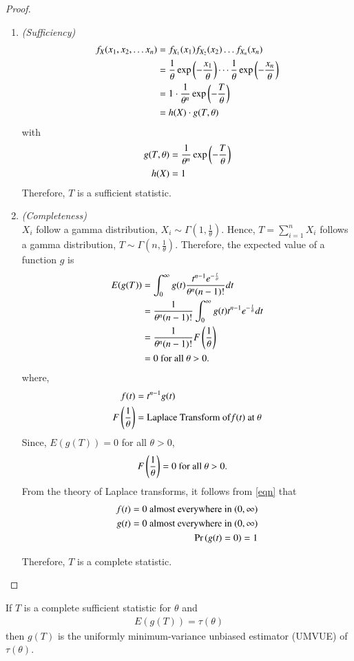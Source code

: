 \documentclass[journal,12pt,twocolumn]{IEEEtran}
\begin{document}
\begin{proof}
\begin{enumerate}
\item \textit{(Sufficiency)}
\begin{align}
f_{X}(x_1, x_2, \ldots x_n) &= f_{X_1}(x_1)f_{X_2}(x_2) \ldots f_{X_n}(x_n)\\
&= \dfrac{1}{\theta} \exp\left(-\dfrac{x_1}{\theta}\right) \cdots \dfrac{1}{\theta} \exp\left(-\dfrac{x_n}{\theta}\right)\\
&= 1 \cdot \dfrac{1}{\theta^n} \exp\left(-\dfrac{T}{\theta}\right)\\
&= h(X) \cdot g(T, \theta) 
\end{align}
with 
\begin{align}
g(T, \theta) &= \dfrac{1}{\theta^n} \exp\left(-\dfrac{T}{\theta}\right)\\
h(X) &= 1
\end{align}
Therefore, $T$ is a sufficient statistic.\\
\item \textit{(Completeness)}\\
$X_i$ follow a gamma distribution, $X_i \sim \Gamma (1, \frac{1}{\theta})$. Hence, $T = \sum_{i=1}^n X_i $ follows a gamma distribution, $T \sim \Gamma (n, \frac{1}{\theta})$. Therefore, the expected value of a function $g$ is
\begin{align}
E(g(T)) &= 
\int_0 ^{\infty} g(t) \dfrac{t^{n-1} e^{-\frac{t}{\theta}}}{\theta^n(n-1)!} dt\\ 
&= \frac{1}{\theta^n (n-1)!} \int_0 ^{\infty} g(t) t^{n-1} e^{-\frac{t}{\theta}} dt\\ 
&= \frac{1}{\theta^n (n-1)!} F \left(\frac{1}{\theta}\right)\\
&= 0 \text{ for all } \theta > 0.
\end{align}
where, 
\begin{align}
f(t) &= t^{n-1}g(t)\\
F \left(\frac{1}{\theta}\right) &= \text{Laplace Transform of} f(t) \text{ at } \theta
\end{align}
Since, $E(g(T))=0$ for all $\theta > 0$, 
\begin{align}
\label{eqn}
F \left(\frac{1}{\theta}\right) &= 0 \text{ for all } \theta > 0.
\end{align}
From the theory of Laplace transforms, it follows from \eqref{eqn} that
\begin{align}
f(t)=0 \text{ almost everywhere in } (0, \infty)\\
g(t)=0 \text{ almost everywhere in } (0, \infty)\\
\Pr\left(g(t)=0\right) = 1
\end{align}

Therefore, $T$ is a complete statistic.
\end{enumerate}
\end{proof}
\begin{theorem}
If $T$ is a complete sufficient statistic for $\theta$ and 
\begin{align}
\label{eqn 2.0.1}
E(g(T)) = \tau(\theta)
\end{align}
then $g(T)$ is the uniformly minimum-variance unbiased estimator (UMVUE) of $\tau(\theta)$.
\end{theorem}
\end{document}
